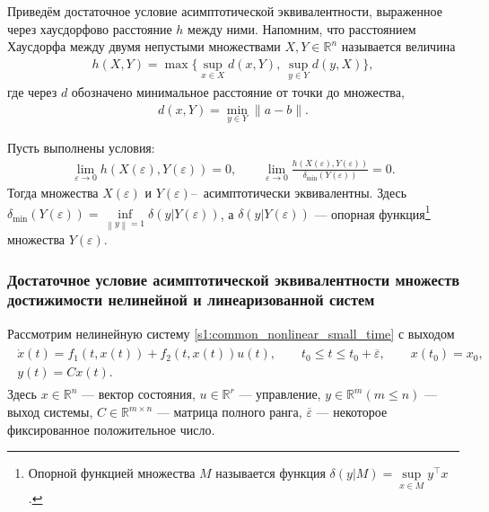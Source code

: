 \documentclass[../main.tex]{subfiles}
\begin{document}
Приведём достаточное условие асимптотической эквивалентности, выраженное через хаусдорфово расстояние $ h $ между ними. 
Напомним, что расстоянием Хаусдорфа между двумя непустыми множествами $X, Y \in \mathbb{R}^n$ называется величина 
\begin{gather*}
	h(X,Y) = \max\Big\{ \sup\limits_{x \in X} d(x, Y), \ \sup\limits_{y \in Y} d(y, X) \Big\},
\end{gather*}
где через $d$ обозначено минимальное расстояние от точки до множества, 
\begin{gather*}
	d(x, Y) = \min\limits_{y \in Y} \| a - b\|.
\end{gather*} 
\begin{theorem}\label{suff}\cite{GusevUMJ}
 Пусть выполнены условия:
 \begin{gather*}
 \lim\limits_{\varepsilon \rightarrow 0}h(X(\varepsilon),Y(\varepsilon)) = 0, \qquad \lim\limits_{\varepsilon \rightarrow 0}\frac{h(X(\varepsilon),Y(\varepsilon))}{\delta_{\min}(Y(\varepsilon))} = 0.
 \end{gather*}
 Тогда множества $ X(\varepsilon) $ и $ Y(\varepsilon) $\---~асимптотически эквивалентны.  Здесь \\ $ \delta_{\min}(Y(\varepsilon)) = \inf\limits_{\left\|y \right\| =1 } \delta(y|Y(\varepsilon))$, а $ \delta(y|Y(\varepsilon)) $ --- опорная функция\footnote{
 	Опорной функцией множества $M$ называется функция $\delta(y|M) = \sup\limits_{x \in M} y^{\top} x$. 
 } множества $ Y(\varepsilon) $.
\end{theorem}
\subsubsection{Достаточное условие асимптотической эквивалентности множеств достижимости нелинейной и линеаризованной систем}
 Рассмотрим нелинейную систему \eqref{s1:common_nonlinear_small_time} с выходом
\begin{gather}\label{s2:nonlinear_with_output}
 \begin{gathered}
 \dot{x}(t)=f_1(t,x(t))+f_2(t,x(t))u(t), \qquad t_0 \leqslant t \leqslant t_0 + \overline{\varepsilon}, \qquad x(t_0) = x_0, \\
 y(t) = C x(t).
 \end{gathered}
\end{gather}
Здесь $ x \in \mathbb{R}^n $ --- вектор состояния, $ u \in \mathbb{R}^r $ --- управление, $ y\in\mathbb{R}^m (m \leqslant n) $ --- выход системы,
$ C\in \mathbb{R}^{m \times n} $ --- матрица полного ранга, $ \overline{\varepsilon} $ --- некоторое фиксированное положительное число.
\end{document}
